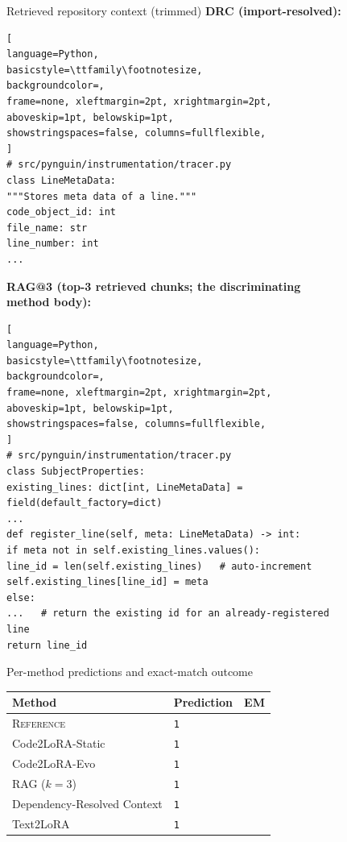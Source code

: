 \documentclass{llmxive}
\providecommand{\codelora}{Code2LoRA\xspace}
\providecommand{\codelorastatic}{\codelora-Static\xspace}
\providecommand{\codeloraevo}{\codelora-Evo\xspace}
\providecommand{\textlora}{Text2LoRA\xspace}
\begin{document}
\begin{figure}[!htbp]
\begin{center}
\begin{tcolorbox}
\begin{qexsection}{Retrieved repository context (trimmed)}
\textbf{\footnotesize DRC (import-resolved):}
\begin{lstlisting}[
language=Python,
basicstyle=\ttfamily\footnotesize,
backgroundcolor=,
frame=none, xleftmargin=2pt, xrightmargin=2pt,
aboveskip=1pt, belowskip=1pt,
showstringspaces=false, columns=fullflexible,
]
# src/pynguin/instrumentation/tracer.py
class LineMetaData:
"""Stores meta data of a line."""
code_object_id: int
file_name: str
line_number: int
...
\end{lstlisting}
\textbf{\footnotesize RAG@3 (top-3 retrieved chunks; the discriminating method body):}
\begin{lstlisting}[
language=Python,
basicstyle=\ttfamily\footnotesize,
backgroundcolor=,
frame=none, xleftmargin=2pt, xrightmargin=2pt,
aboveskip=1pt, belowskip=1pt,
showstringspaces=false, columns=fullflexible,
]
# src/pynguin/instrumentation/tracer.py
class SubjectProperties:
existing_lines: dict[int, LineMetaData] = field(default_factory=dict)
...
def register_line(self, meta: LineMetaData) -> int:
if meta not in self.existing_lines.values():
line_id = len(self.existing_lines)   # auto-increment
self.existing_lines[line_id] = meta
else:
...   # return the existing id for an already-registered line
return line_id
\end{lstlisting}
\end{qexsection}

\begin{qexsection}{Per-method predictions and exact-match outcome}
\footnotesize
\setlength{\tabcolsep}{6pt}
\begin{tabular}{@{}llc@{}}
\toprule
Method & Prediction & EM \\
\midrule
\textsc{Reference}                            & \texttt{1}     & \\
\midrule
\codelorastatic{}                             & \texttt{1}     &  \\
\codeloraevo{}                                & \texttt{1}     &  \\
RAG ($k\!=\!3$)                               & \texttt{1}     &  \\
Dependency-Resolved Context                   & \texttt{1}     &  \\
\textlora{}                                   & \texttt{1}     &  \\
\bottomrule
\end{tabular}
\end{qexsection}


\end{tcolorbox}
\end{center}
\end{figure}
\end{document}
